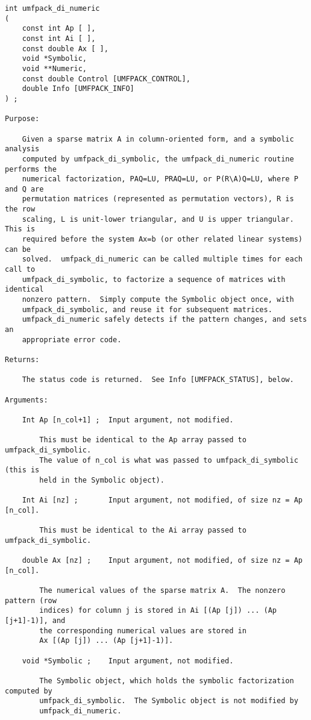 \documentclass[11pt]{article}
\begin{document}
{\footnotesize
\begin{verbatim}
int umfpack_di_numeric
(
    const int Ap [ ],
    const int Ai [ ],
    const double Ax [ ],
    void *Symbolic,
    void **Numeric,
    const double Control [UMFPACK_CONTROL],
    double Info [UMFPACK_INFO]
) ;

Purpose:

    Given a sparse matrix A in column-oriented form, and a symbolic analysis
    computed by umfpack_di_symbolic, the umfpack_di_numeric routine performs the
    numerical factorization, PAQ=LU, PRAQ=LU, or P(R\A)Q=LU, where P and Q are
    permutation matrices (represented as permutation vectors), R is the row
    scaling, L is unit-lower triangular, and U is upper triangular.  This is
    required before the system Ax=b (or other related linear systems) can be
    solved.  umfpack_di_numeric can be called multiple times for each call to
    umfpack_di_symbolic, to factorize a sequence of matrices with identical
    nonzero pattern.  Simply compute the Symbolic object once, with
    umfpack_di_symbolic, and reuse it for subsequent matrices.
    umfpack_di_numeric safely detects if the pattern changes, and sets an
    appropriate error code.

Returns:

    The status code is returned.  See Info [UMFPACK_STATUS], below.

Arguments:

    Int Ap [n_col+1] ;  Input argument, not modified.

        This must be identical to the Ap array passed to umfpack_di_symbolic.
        The value of n_col is what was passed to umfpack_di_symbolic (this is
        held in the Symbolic object).

    Int Ai [nz] ;       Input argument, not modified, of size nz = Ap [n_col].

        This must be identical to the Ai array passed to umfpack_di_symbolic.

    double Ax [nz] ;    Input argument, not modified, of size nz = Ap [n_col].

        The numerical values of the sparse matrix A.  The nonzero pattern (row
        indices) for column j is stored in Ai [(Ap [j]) ... (Ap [j+1]-1)], and
        the corresponding numerical values are stored in
        Ax [(Ap [j]) ... (Ap [j+1]-1)].

    void *Symbolic ;    Input argument, not modified.

        The Symbolic object, which holds the symbolic factorization computed by
        umfpack_di_symbolic.  The Symbolic object is not modified by
        umfpack_di_numeric.


\end{verbatim}}
\end{document}

